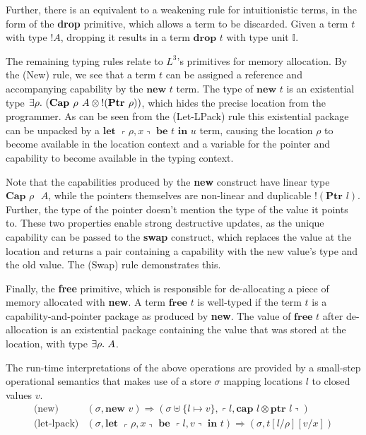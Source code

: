 \documentclass[]{unswthesis}
\newcommand{\Exists}[1]{\exists #1 \ldotp \,}
\newcommand{\letbe}[3]{\textbf{let $#1$ be $#2$ in $#3$}}
\newcommand{\Ptr}[1]{\textbf{Ptr $#1$}}
\newcommand{\ptr}[1]{\textbf{ptr $#1$}}
\newcommand{\Capa}[2]{\textbf{Cap $#1$ $#2$}}
\newcommand{\capa}[1]{\textbf{cap $#1$}}
\newcommand{\lquine}{\left\ulcorner}
\newcommand{\rquine}{\right\urcorner}
\newcommand{\drop}[1]{\textbf{drop $#1$}}
\newcommand{\lnew}[1]{\textbf{new $#1$}}
\newcommand{\lfree}[1]{\textbf{free $#1$}}
\newcommand{\qpair}[2]{\lquine #1, #2 \rquine}
\newcommand{\semrule}[1]{\text{(#1)}}
\let\b\textbf
\begin{document}
Further, there is an equivalent to a weakening rule for intuitionistic terms, in the form of the \b{drop} primitive, which allows a term to be discarded. Given a term $t$ with type ${!A}$, dropping it results in a term $\drop{t}$ with type unit $\mathds{I}$.

The remaining typing rules relate to $L^3$'s primitives for memory allocation. By the (New) rule, we see that a term $t$ can be assigned a reference and accompanying capability by the $\lnew{t}$ term. The type of $\lnew{t}$ is an existential type $\Exists{\rho} (\Capa{\rho}{A} \otimes {!(\Ptr{\rho})})$, which hides the precise location from the programmer. As can be seen from the (Let-LPack) rule this existential package can be unpacked by a $\letbe{\qpair{\rho}{x}}{t}{u}$ term, causing the location $\rho$ to become available in the location context and a variable for the pointer and capability to become available in the typing context.

Note that the capabilities produced by the \b{new} construct have linear type $\Capa{\rho}{A}$, while the pointers themselves are non-linear and duplicable $!(\Ptr{l})$. Further, the type of the pointer doesn't mention the type of the value it points to. These two properties enable strong destructive updates, as the unique capability can be passed to the \b{swap} construct, which replaces the value at the location and returns a pair containing a capability with the new value's type and the old value. The (Swap) rule demonstrates this.

Finally, the \b{free} primitive, which is responsible for de-allocating a piece of memory allocated with \b{new}. A term $\lfree{t}$ is well-typed if the term $t$ is a capability-and-pointer package as produced by \b{new}. The value of $\lfree{t}$ after de-allocation is an existential package containing the value that was stored at the location, with type $\Exists{\rho} A$.

The run-time interpretations of the above operations are provided by a small-step operational semantics that makes use of a store $\sigma$ mapping locations $l$ to closed values $v$.
\begin{eqnarray*}
\semrule{new} & (\sigma, \lnew{v}) \Rightarrow (\sigma \uplus \{l \mapsto v\},
  \qpair{l}{\capa{l} \otimes \ptr l})
\\
\semrule{let-lpack} & (\sigma, \letbe{\qpair{\rho}{x}}{\qpair{l}{v}}{t})
  \Rightarrow
  (\sigma, t[l/\rho][v/x])
\end{eqnarray*}
\end{document}
